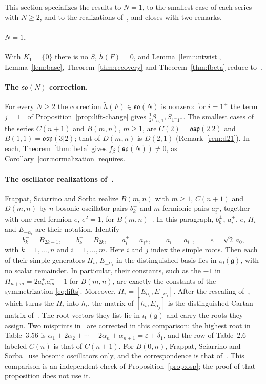 \documentclass[11pt]{article}
\numberwithin{equation}{section}
\theoremstyle{definition}
\theoremstyle{remark}
\newcommand{\osp}{\mathfrak{osp}}
\begin{document}
This section specializes the results to $N=1$, to the smallest case of each series with $N\geq2$, and to the
realizations of~\cite{FSS00}, and closes with two remarks.

\paragraph{$N=1$.} With $K_1=\{0\}$ there is no $S$, $\tilde h(F)=0$, and
Lemma~\ref{lem:untwist}, Lemma~\ref{lem:base}, Theorem~\ref{thm:recovery} and
Theorem~\ref{thm:fbeta} reduce to~\cite[Lemma~2.2, Lemma~2.3, Proposition~3.1,
Theorem~4.1]{Aoi26}.

\paragraph{The $\mathfrak{so}(N)$ correction.} For every $N\geq2$ the correction
$\tilde h(F)\in\mathfrak{so}(N)$ is nonzero: for $i=1^+$ the term $j=1^-$ of
Proposition~\ref{prop:lift-change} gives $\tfrac12\beta_{u,1^+}S_{1^-1^+}$. The smallest
cases of the series $C(n+1)$ and $B(m,n)$, $m\geq1$, are $C(2)=\osp(2|2)$ and $B(1,1)=\osp(3|2)$; that of
$D(m,n)$ is $D(2,1)$ (Remark~\ref{rem:d21}). In each, Theorem~\ref{thm:fbeta} gives
$f_\beta(\mathfrak{so}(N))\neq0$, as Corollary~\ref{cor:normalization} requires.

\paragraph{The oscillator realizations of~\cite{FSS00}.} Frappat, Sciarrino and Sorba
realize $B(m,n)$ with $m\geq1$, $C(n+1)$ and $D(m,n)$ by $n$ bosonic oscillator pairs
$b_k^\pm$ and $m$ fermionic pairs $a_i^\pm$, together with one real fermion $e$, $e^2=1$,
for $B(m,n)$~\cite[\S2.30, pp.~218--221]{FSS00}. In this paragraph, $b_k^\pm$, $a_i^\pm$, $e$, $H_i$ and
$E_{\pm\alpha_i}$ are their notation. Identify
\[
 b_k^-=B_{2k-1},\qquad b_k^+=B_{2k},\qquad a_i^+=a_{i^+},\qquad a_i^-=a_{i^-},\qquad
 e=\sqrt2\,a_0 ,
\]
with $k=1,\ldots,n$ and $i=1,\ldots,m$. Here $i$ and $j$ index the simple roots. Then each of their
simple generators $H_i$, $E_{\pm\alpha_i}$ in the distinguished basis
lies in $\iota_0(\mathfrak g)$, with no scalar remainder. In particular, their constants,
such as the $-1$ in $H_{n+m}=2a_m^+a_m^--1$ for $B(m,n)$, are exactly the constants of
the symmetrization \eqref{eq:lifts}. Moreover,
$H_i=[E_{\alpha_i},E_{-\alpha_i}]$. After the rescaling of~\cite[\S2.2]{FSS00}, which turns the $H_i$ into $h_i$, the matrix of $[h_i,E_{\alpha_j}]$ is the
distinguished Cartan matrix of~\cite[Tables~3.54, 3.56, 3.57]{FSS00}. The root vectors
they list lie in $\iota_0(\mathfrak g)$ and carry the roots they assign. Two misprints
in~\cite{FSS00} are corrected in this comparison: the highest root in Table~3.56 is
$\alpha_1+2\alpha_2+\cdots+2\alpha_n+\alpha_{n+1}=\varepsilon+\delta_1$, and the row of
Table~2.6 labeled $C(n)$ is that of $C(n+1)$. For $B(0,n)$, Frappat, Sciarrino and Sorba~\cite{FSS00} use bosonic
oscillators only, and the correspondence is that of~\cite[Section~2]{Aoi26}. This comparison
is an independent check of Proposition~\ref{prop:osp}; the proof of that proposition does not use it.
\end{document}

